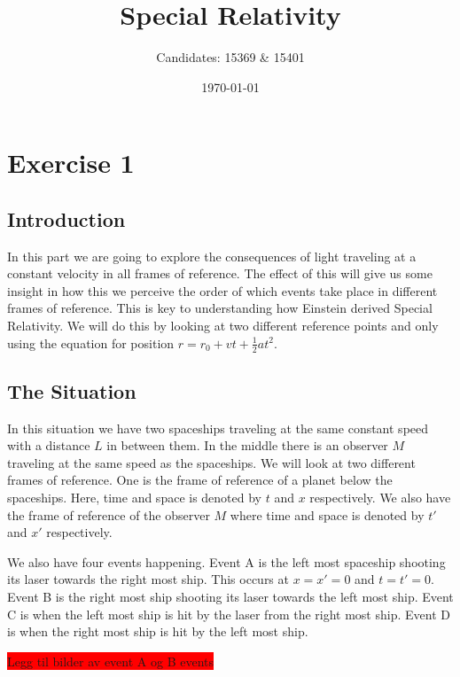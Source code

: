 \documentclass[reprint,english,notitlepage]{revtex4-2}
\begin{document}
\title{Special Relativity}
\author{Candidates: 15369 \& 15401}
\date{\today}


\maketitle

\section{Exercise 1}\label{ex: 1}

  \subsection{Introduction}
  In this part we are going to explore the consequences of light traveling at a constant velocity in all frames of reference. The effect of this will give us some insight in how this we perceive the order of which events take place in different frames of reference. This is key to understanding how Einstein derived Special Relativity. We will do this by looking at two different reference points and only using the equation for position $ r = r_0 + vt + \frac{1}{2} at ^{2} $. 

  \subsection{The Situation}
  In this situation we have two spaceships traveling at the same constant speed with a distance $ L $ in between them. In the middle there is an observer $ M $ traveling at the same speed as the spaceships. We will look at two different frames of reference. One is the frame of reference of a planet below the spaceships. Here, time and space is denoted by $ t $ and $ x $ respectively. We also have the frame of reference of the observer $ M $ where time and space is denoted by $ t' $ and $ x' $ respectively. 
  
  We also have four events happening. Event A is the left most spaceship shooting its laser towards the right most ship. This occurs at $  x = x' = 0 $ and $ t = t' = 0 $. Event B is the right most ship shooting its laser towards the left most ship. Event C is when the left most ship is hit by the laser from the right most ship. Event D is when the right most ship is hit by the left most ship. 
  
  \colorbox{red}{Legg til bilder av event A og B events} 
\end{document}
